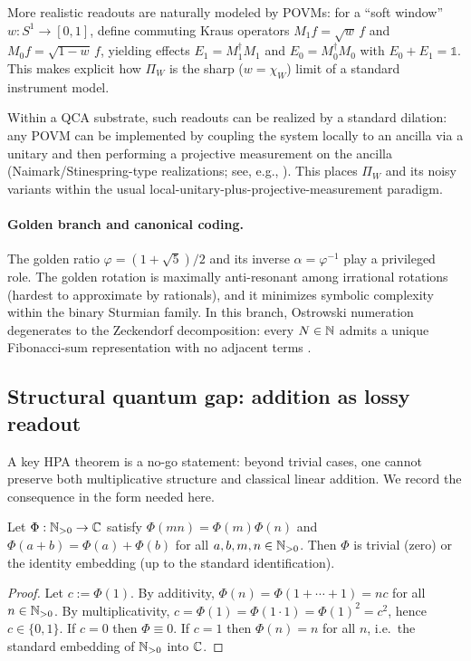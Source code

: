 \noindent More realistic readouts are naturally modeled by POVMs: for a ``soft window'' $w:S^1\to[0,1]$, define commuting Kraus operators
$M_1 f=\sqrt{w}\,f$ and $M_0 f=\sqrt{1-w}\,f$, yielding effects $E_1=M_1^\dagger M_1$ and $E_0=M_0^\dagger M_0$ with $E_0+E_1=\mathds{1}$.
This makes explicit how $\Pi_W$ is the sharp ($w=\chi_W$) limit of a standard instrument model.

\noindent Within a QCA substrate, such readouts can be realized by a standard dilation: any POVM can be implemented by coupling the system locally to an ancilla via a unitary and then performing a projective measurement on the ancilla (Naimark/Stinespring-type realizations; see, e.g., \cite{NielsenChuang2012,Watrous2018}).
This places $\Pi_W$ and its noisy variants within the usual local-unitary-plus-projective-measurement paradigm.

\paragraph{Golden branch and canonical coding.}
The golden ratio $\varphi=(1+\sqrt{5})/2$ and its inverse $\alpha=\varphi^{-1}$ play a privileged role.
The golden rotation is maximally anti-resonant among irrational rotations (hardest to approximate by rationals), and it minimizes symbolic complexity within the binary Sturmian family.
In this branch, Ostrowski numeration degenerates to the Zeckendorf decomposition: every $N\in\mathbb{N}$ admits a unique Fibonacci-sum representation with no adjacent terms \cite{Zeckendorf1972,Cassels1957,KuipersNiederreiter1974}.

\subsection{Structural quantum gap: addition as lossy readout}
\label{subsec:quantum_gap}
A key HPA theorem is a no-go statement: beyond trivial cases, one cannot preserve both multiplicative structure and classical linear addition.
We record the consequence in the form needed here.

\begin{theorem}
\label{thm:no_go_additive}
Let $\Phi:\mathbb{N}_{>0}\to\mathbb{C}$ satisfy $\Phi(mn)=\Phi(m)\Phi(n)$ and $\Phi(a+b)=\Phi(a)+\Phi(b)$ for all $a,b,m,n\in\mathbb{N}_{>0}$. Then $\Phi$ is trivial (zero) or the identity embedding (up to the standard identification).
\end{theorem}
\begin{proof}
Let $c:=\Phi(1)$.
By additivity, $\Phi(n)=\Phi(1+\cdots+1)=nc$ for all $n\in\mathbb{N}_{>0}$.
By multiplicativity, $c=\Phi(1)=\Phi(1\cdot 1)=\Phi(1)^2=c^2$, hence $c\in\{0,1\}$.
If $c=0$ then $\Phi\equiv 0$.
If $c=1$ then $\Phi(n)=n$ for all $n$, i.e.\ the standard embedding of $\mathbb{N}_{>0}$ into $\mathbb{C}$.
\end{proof}

